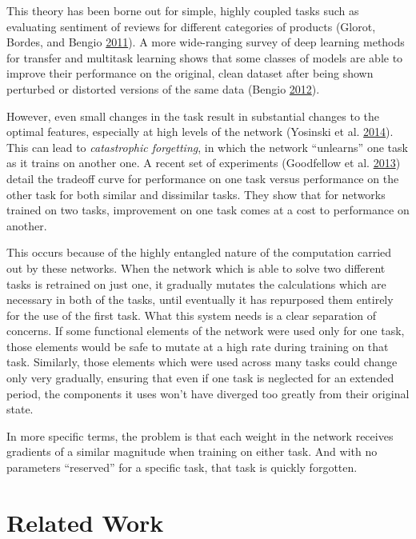 \documentclass[12pt,twoside]{mitthesis}
\begin{document}
This theory has been borne out for simple, highly coupled tasks such as
evaluating sentiment of reviews for different categories of products
(Glorot, Bordes, and Bengio
\protect\hyperlink{ref-glorot2011domain}{2011}). A more wide-ranging
survey of deep learning methods for transfer and multitask learning
shows that some classes of models are able to improve their performance
on the original, clean dataset after being shown perturbed or distorted
versions of the same data (Bengio
\protect\hyperlink{ref-bengio2012deep}{2012}).

However, even small changes in the task result in substantial changes to
the optimal features, especially at high levels of the network (Yosinski
et al. \protect\hyperlink{ref-yosinski2014transferable}{2014}). This can
lead to \emph{catastrophic forgetting}, in which the network
``unlearns'' one task as it trains on another one. A recent set of
experiments (Goodfellow et al.
\protect\hyperlink{ref-goodfellow2013empirical}{2013}) detail the
tradeoff curve for performance on one task versus performance on the
other task for both similar and dissimilar tasks. They show that for
networks trained on two tasks, improvement on one task comes at a cost
to performance on another.

This occurs because of the highly entangled nature of the computation
carried out by these networks. When the network which is able to solve
two different tasks is retrained on just one, it gradually mutates the
calculations which are necessary in both of the tasks, until eventually
it has repurposed them entirely for the use of the first task. What this
system needs is a clear separation of concerns. If some functional
elements of the network were used only for one task, those elements
would be safe to mutate at a high rate during training on that task.
Similarly, those elements which were used across many tasks could change
only very gradually, ensuring that even if one task is neglected for an
extended period, the components it uses won't have diverged too greatly
from their original state.

In more specific terms, the problem is that each weight in the network
receives gradients of a similar magnitude when training on either task.
And with no parameters ``reserved'' for a specific task, that task is
quickly forgotten.

\section{Related Work}\label{related-work-1}
\end{document}
